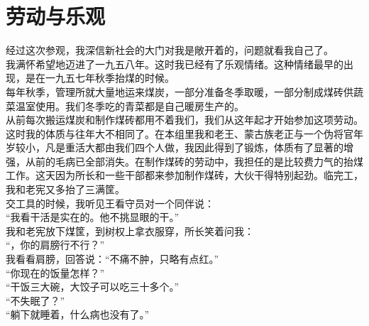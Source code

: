 \fancyhead[RO]{} %
\fancyhead[LE]{} %
\chapter*{劳动与乐观}
\thispagestyle{empty}
经过这次参观，我深信新社会的大门对我是敞开着的，问题就看我自己了。\\

我满怀希望地迈进了一九五八年。这时我已经有了乐观情绪。这种情绪最早的出现，是在一九五七年秋季抬煤的时候。\\

每年秋季，管理所就大量地运来煤炭，一部分准备冬季取暖，一部分制成煤砖供蔬菜温室使用。我们冬季吃的青菜都是自己暖房生产的。\\

从前每次搬运煤炭和制作煤砖都用不着我们，我们从这年起才开始参加这项劳动。这时我的体质与往年大不相同了。在本组里我和老王、蒙古族老正与一个伪将官年岁较小，凡是重活大都由我们四个人做，我因此得到了锻炼，体质有了显著的增强，从前的毛病已全部消失。在制作煤砖的劳动中，我担任的是比较费力气的抬煤工作。这天因为所长和一些干部都来参加制作煤砖，大伙干得特别起劲。临完工，我和老宪又多抬了三满筐。\\

交工具的时候，我听见王看守员对一个同伴说：\\

“我看干活是实在的。他不挑显眼的干。”\\

我和老宪放下煤筐，到树权上拿衣服穿，所长笑着问我：\\

“，你的肩膀行不行？”\\

我看看肩膀，回答说：“不痛不肿，只略有点红。”\\

“你现在的饭量怎样？”\\

“干饭三大碗，大饺子可以吃三十多个。”\\

“不失眠了？”\\

“躺下就睡着，什么病也没有了。”\\

